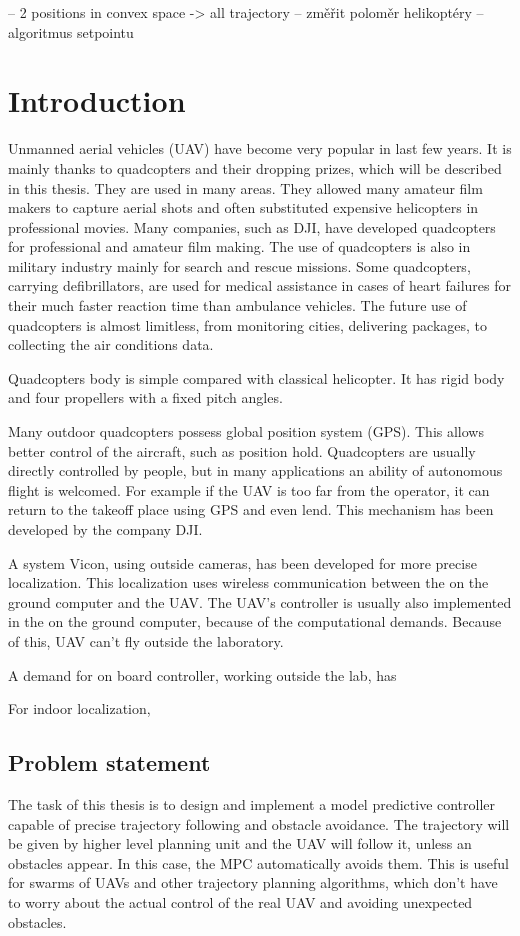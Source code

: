 \documentclass[a4paper,11pt,titlepage]{article}
\begin{document}
-- 2 positions in convex space -> all trajectory
-- změřit poloměr helikoptéry
-- algoritmus setpointu


\section{Introduction}
Unmanned aerial vehicles (UAV) have become very popular in last few years. It is mainly thanks to quadcopters and their dropping prizes, which will be described in this thesis. They are used in many areas. They allowed many amateur film makers to capture aerial shots and often substituted expensive helicopters in professional movies. Many companies, such as DJI, have developed quadcopters for professional and amateur film making. The use of quadcopters is also in military industry mainly for search and rescue missions. Some quadcopters, carrying defibrillators, are used for medical assistance in cases of heart failures for their much faster reaction time than ambulance vehicles. The future use of quadcopters is almost limitless, from monitoring cities, delivering packages, to collecting the air conditions data. 

Quadcopters body is simple compared with classical helicopter. It has rigid body and four propellers with a fixed pitch angles. 

Many outdoor quadcopters possess global position system (GPS). This allows better control of the aircraft, such as position hold. Quadcopters are usually directly controlled by people, but in many applications an ability of autonomous flight is welcomed. For example if the UAV is too far from the operator, it can return to the takeoff place using GPS and even lend. This mechanism has been developed by the company DJI. 

A system Vicon, using outside cameras, has been developed for more precise localization. This localization uses wireless communication between the on the ground computer and the UAV. The UAV's controller is usually also implemented in the on the ground computer, because of the computational demands. Because of this, UAV can't fly outside the laboratory. 

A demand for on board controller, working outside the lab, has 

For indoor localization,

\subsection{Problem statement}
The task of this thesis is to design and implement a model predictive controller capable of precise trajectory following and obstacle avoidance. The trajectory will be given by higher level planning unit and the UAV will follow it, unless an obstacles appear. In this case, the MPC automatically avoids them. This is useful for swarms of UAVs and other trajectory planning algorithms, which don't have to worry about the actual control of the real UAV and avoiding unexpected obstacles.
\end{document}
